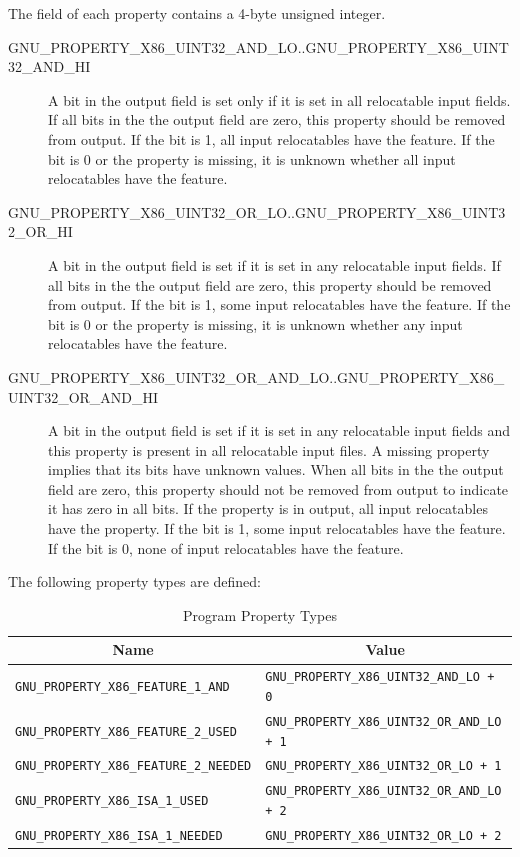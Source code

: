 The  field of each property contains a 4-byte unsigned
integer.

\begin{description}
 \item[GNU_PROPERTY_X86_UINT32_AND_LO..GNU_PROPERTY_X86_UINT32_AND_HI]
   A bit in the output  field is set only if it is set in
   all relocatable input  fields.  If all bits in the
   the output  field are zero, this property should be
   removed from output.  If the bit is 1, all input relocatables have
   the feature.  If the bit is 0 or the property is missing, it is
   unknown whether all input relocatables have the feature.
 \item[GNU_PROPERTY_X86_UINT32_OR_LO..GNU_PROPERTY_X86_UINT32_OR_HI]
   A bit in the output  field is set if it is set in any
   relocatable input  fields.  If all bits in the
   the output  field are zero, this property should be
   removed from output.  If the bit is 1, some input relocatables have
   the feature.  If the bit is 0 or the property is missing, it is
   unknown whether any input relocatables have the feature.
 \item[GNU_PROPERTY_X86_UINT32_OR_AND_LO..GNU_PROPERTY_X86_UINT32_OR_AND_HI]
   A bit in the output  field is set if it is set in any
   relocatable input  fields and this property is present
   in all relocatable input files.  A missing property implies that its
   bits have unknown values.  When all bits in the the output
    field are zero, this property should not be removed
   from output to indicate it has zero in all bits.  If the property
   is in output, all input relocatables have the property.  If the bit
   is 1, some input relocatables have the feature.  If the bit is 0,
   none of input relocatables have the feature.
\end{description}

The following property types are defined:

\begin{table}[H]
\Hrule
  \caption{Program Property Types}
  \begin{center}
    \myfontsize
    \begin{tabular}[t]{l|l}
      \multicolumn{1}{c}{Name} & \multicolumn{1}{c}{Value} \\
      \hline
     \texttt{GNU_PROPERTY_X86_FEATURE_1_AND} &
     \texttt{GNU_PROPERTY_X86_UINT32_AND_LO + 0} \\
     \texttt{GNU_PROPERTY_X86_FEATURE_2_USED} &
     \texttt{GNU_PROPERTY_X86_UINT32_OR_AND_LO + 1} \\
     \texttt{GNU_PROPERTY_X86_FEATURE_2_NEEDED} &
     \texttt{GNU_PROPERTY_X86_UINT32_OR_LO + 1} \\
     \texttt{GNU_PROPERTY_X86_ISA_1_USED} &
     \texttt{GNU_PROPERTY_X86_UINT32_OR_AND_LO + 2} \\
     \texttt{GNU_PROPERTY_X86_ISA_1_NEEDED} &
     \texttt{GNU_PROPERTY_X86_UINT32_OR_LO + 2} \\
    \end{tabular}
  \end{center}
\Hrule
\end{table}

